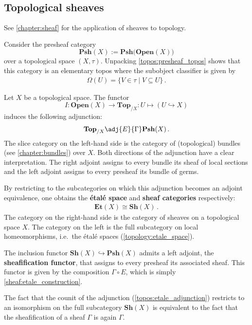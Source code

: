 \subsection{Topological sheaves}

    See \cref{chapter:sheaf} for the application of sheaves to topology.

    \begin{property}\label{topos:sheaf_topos}
        Consider the presheaf category \[\mathbf{Psh}(X):=\mathbf{Psh(Open}(X))\] over a topological space $(X,\tau)$. Unpacking \cref{topos:presheaf_topos} shows that this category is an elementary topos where the subobject classifier is given by
        \begin{gather}
            \Omega(U) = \{V\in\tau\mid V\subseteq U\}\,.
        \end{gather}
    \end{property}

    \begin{construct}\label{topos:etale_adjunction}
        Let $X$ be a topological space. The functor \[I:\mathbf{Open}(X)\rightarrow\mathbf{Top}_{/X}:U\mapsto(U\hookrightarrow X)\] induces the following adjunction:
        \begin{gather}
            \mathbf{Top}_{/X}\adj{E}{\Gamma}\mathbf{Psh}(X)\,.
        \end{gather}
        The slice category on the left-hand side is the category of (topological) bundles (see \cref{chapter:bundles}) over $X$. Both directions of the adjunction have a clear interpretation. The right adjoint assigns to every bundle its sheaf of local sections and the left adjoint assigns to every presheaf its bundle of germs.

        By restricting to the subcategories on which this adjunction becomes an adjoint equivalence, one obtains the \textbf{\'etal\'e space} and \textbf{sheaf categories} respectively:
        \begin{gather}
            \mathbf{Et}(X)\cong\mathbf{Sh}(X)\,.
        \end{gather}
        The category on the right-hand side is the category of sheaves on a topological space $X$. The category on the left is the full subcategory on local homeomorphisms, i.e.~the \'etal\'e spaces (\cref{topology:etale_space}).
    \end{construct}

    \begin{property}
        The inclusion functor $\mathbf{Sh}(X)\hookrightarrow\mathbf{Psh}(X)$ admits a left adjoint, the \textbf{sheafification functor}, that assigns to every presheaf its associated sheaf. This functor is given by the composition $\Gamma\circ E$, which is simply \cref{sheaf:etale_construction}.

        The fact that the counit of the adjunction (\cref{topos:etale_adjunction}) restricts to an isomorphism on the full subcategory $\mathbf{Sh}(X)$ is equivalent to the fact that the sheafification of a sheaf $\Gamma$ is again $\Gamma$.
    \end{property}

